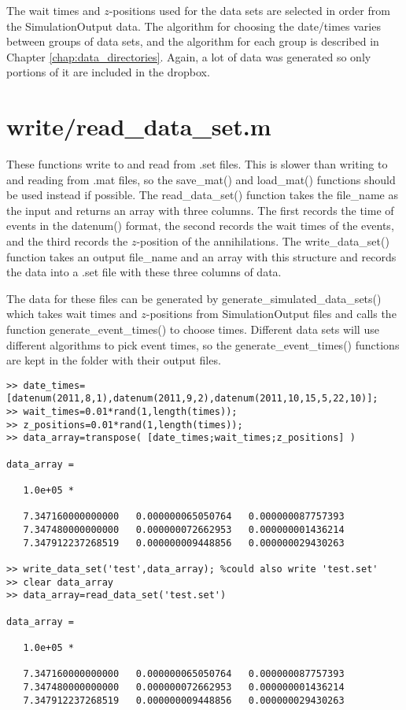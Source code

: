 \documentclass[12pt]{report}
\begin{document}
The wait times and $z$-positions used for the data sets are selected in order from the SimulationOutput data.  The algorithm for choosing the date/times varies between groups of data sets, and the algorithm for each group is described in Chapter \ref{chap:data_directories}.  Again, a lot of data was generated so only portions of it are included in the dropbox.

\section{write/read\_data\_set.m}
These functions write to and read from .set files.  This is slower than writing to and reading from .mat files, so the save\_mat() and load\_mat() functions should be used instead if possible.  The read\_data\_set() function takes the file\_name as the input and returns an array with three columns. The first records the time of events in the datenum() format, the second records the wait times of the events, and the third records the $z$-position of the annihilations.  The write\_data\_set() function takes an output file\_name and an array with this structure and records the data into a .set file with these three columns of data.

The data for these files can be generated by generate\_simulated\_data\_sets() which takes wait times and $z$-positions from SimulationOutput files and calls the function generate\_event\_times() to choose times.  Different data sets will use different algorithms to pick event times, so the generate\_event\_times() functions are kept in the folder with their output files.

\begin{verbatim}
>> date_times=[datenum(2011,8,1),datenum(2011,9,2),datenum(2011,10,15,5,22,10)];
>> wait_times=0.01*rand(1,length(times));
>> z_positions=0.01*rand(1,length(times));
>> data_array=transpose( [date_times;wait_times;z_positions] )

data_array =

   1.0e+05 *

   7.347160000000000   0.000000065050764   0.000000087757393
   7.347480000000000   0.000000072662953   0.000000001436214
   7.347912237268519   0.000000009448856   0.000000029430263

>> write_data_set('test',data_array); %could also write 'test.set'
>> clear data_array
>> data_array=read_data_set('test.set')

data_array =

   1.0e+05 *

   7.347160000000000   0.000000065050764   0.000000087757393
   7.347480000000000   0.000000072662953   0.000000001436214
   7.347912237268519   0.000000009448856   0.000000029430263
\end{verbatim}
\end{document}
